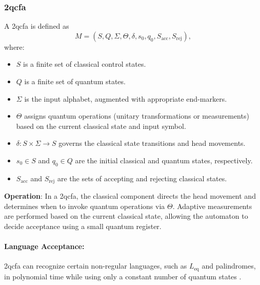 \subsubsection{\gls{2qcfa}}
\label{sssec:2qcfa}
\begin{definition}
A \gls{2qcfa} is defined as 
\[
M = (S, Q, \Sigma, \Theta, \delta, s_0, q_0, S_{\text{acc}}, S_{\text{rej}}),
\]
where:
\begin{itemize}
    \item \( S \) is a finite set of classical control states.
    \item \( Q \) is a finite set of quantum states.
    \item \( \Sigma \) is the input alphabet, augmented with appropriate end-markers.
    \item \( \Theta \) assigns quantum operations (unitary transformations or measurements) based on the current classical state and input symbol.
    \item \( \delta: S \times \Sigma \to S \) governs the classical state transitions and head movements.
    \item \( s_0 \in S \) and \( q_0 \in Q \) are the initial classical and quantum states, respectively.
    \item \( S_{\text{acc}} \) and \( S_{\text{rej}} \) are the sets of accepting and rejecting classical states.
\end{itemize}
\end{definition}

\textbf{Operation}:  
In a \gls{2qcfa}, the classical component directs the head movement and determines when to invoke quantum operations via \( \Theta \). Adaptive measurements are performed based on the current classical state, allowing the automaton to decide acceptance using a small quantum register.

\paragraph{Language Acceptance:}  
\gls{2qcfa} can recognize certain non-regular languages, such as \( L_{\text{eq}} \) and palindromes, in polynomial time while using only a constant number of quantum states \cite{ambainis2002quantum}.

